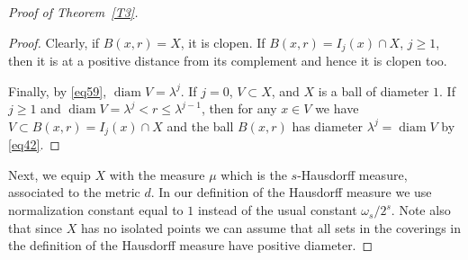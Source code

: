 \documentclass[12pt,leqno]{amsart}
\theoremstyle{definition}
\def\diam{\operatorname{diam}}
\numberwithin{theorem}{section} \numberwithin{equation}{section}
\begin{document}
\begin{proof}[Proof of Theorem~\ref{T3}]
\begin{proof}
Clearly, if $B(x,r)=X$, it is clopen. If $B(x,r)=I_j(x)\cap X$, $j\geq 1$, then it is at a positive distance from its complement and hence it is clopen too.

Finally, by \eqref{eq59}, $\diam V=\lambda^j$. If $j=0$, $V\subset X$, and $X$ is a ball of diameter $1$. If $j\geq 1$ and $\diam V=\lambda^j<r\leq \lambda^{j-1}$, then
for any $x\in V$ we have
$V\subset B(x,r)=I_j(x)\cap X$ and the ball $B(x,r)$ has diameter $\lambda^j=\diam V$ by \eqref{eq42}.
\end{proof}


Next, we equip $X$ with the measure $\mu$ which is the $s$-Hausdorff measure, associated to the metric $d$. In our definition of the Hausdorff measure we use normalization constant equal to $1$ instead of the usual constant $\omega_s/2^s$.
Note also that since $X$ has no isolated points we can assume that all sets in the coverings in the definition of the Hausdorff measure have positive diameter.


\end{proof}
\end{document}
